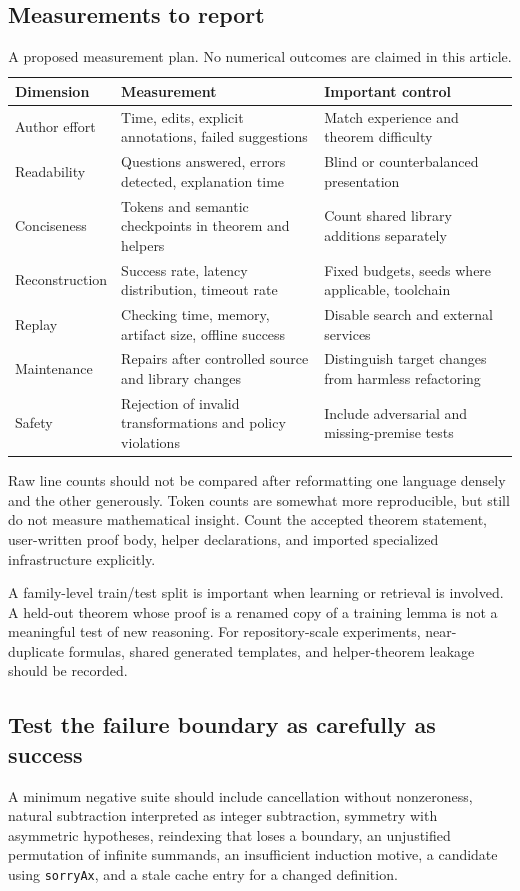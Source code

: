 \documentclass[11pt,a4paper]{article}
\newcommand{\code}[1]{\nolinkurl{#1}}
\theoremstyle{definition}
\theoremstyle{remark}
\numberwithin{equation}{section}
\begin{document}
\subsection{Measurements to report}
\begin{table}[htbp]
\centering\small
\begin{tabularx}{\linewidth}{@{}P{.23\linewidth}YY@{}}
\toprule
Dimension & Measurement & Important control \\
\midrule
Author effort & Time, edits, explicit annotations, failed suggestions & Match experience and theorem difficulty \\
Readability & Questions answered, errors detected, explanation time & Blind or counterbalanced presentation \\
Conciseness & Tokens and semantic checkpoints in theorem and helpers & Count shared library additions separately \\
Reconstruction & Success rate, latency distribution, timeout rate & Fixed budgets, seeds where applicable, toolchain \\
Replay & Checking time, memory, artifact size, offline success & Disable search and external services \\
Maintenance & Repairs after controlled source and library changes & Distinguish target changes from harmless refactoring \\
Safety & Rejection of invalid transformations and policy violations & Include adversarial and missing-premise tests \\
\bottomrule
\end{tabularx}
\caption{A proposed measurement plan. No numerical outcomes are claimed in this article.}
\end{table}
Raw line counts should not be compared after reformatting one language densely and the other generously. Token counts are somewhat more reproducible, but still do not measure mathematical insight. Count the accepted theorem statement, user-written proof body, helper declarations, and imported specialized infrastructure explicitly.

A family-level train/test split is important when learning or retrieval is involved. A held-out theorem whose proof is a renamed copy of a training lemma is not a meaningful test of new reasoning. For repository-scale experiments, near-duplicate formulas, shared generated templates, and helper-theorem leakage should be recorded.

\subsection{Test the failure boundary as carefully as success}
A minimum negative suite should include cancellation without nonzeroness, natural subtraction interpreted as integer subtraction, symmetry with asymmetric hypotheses, reindexing that loses a boundary, an unjustified permutation of infinite summands, an insufficient induction motive, a candidate using \code{sorryAx}, and a stale cache entry for a changed definition.
\end{document}
